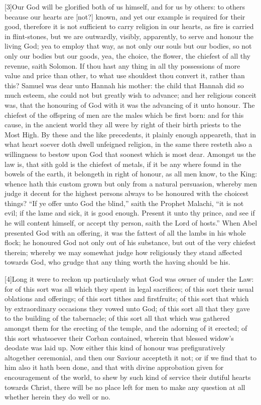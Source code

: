 [3]Our God will be glorified both of us himself, and for us by others: to others because our hearts are [not?] known, and yet our example is required for their good, therefore it is not sufficient to carry religion in our hearts, as fire is carried in flint-stones, but we are outwardly, visibly, apparently, to serve and honour the living God; yea to employ that way, as not only our souls but our bodies, so not only our bodies but our goods, yea, the choice, the flower, the chiefest of all thy revenue, saith Solomon. If thou hast any thing in all thy possessions of more value and price than other, to what use shouldest thou convert it, rather than this? Samuel was dear unto Hannah his mother: the child that  Hannah did so much esteem, she could not but greatly wish to advance; and her religious conceit was, that the honouring of God with it was the advancing of it unto honour. The chiefest of the offspring of men are the males which be first born: and for this cause, in the ancient world they all were by right of their birth priests to the Most High. By these and the like precedents, it plainly enough appeareth, that in what heart soever doth dwell unfeigned religion, in the same there resteth also a willingness to bestow upon God that soonest which is most dear. Amongst us the law is, that sith gold is the chiefest of metals, if it be any where found in the bowels of the earth, it belongeth in right of honour, as all men know, to the King: whence hath this custom grown but only from a natural persuasion, whereby men judge it decent for the highest persons always to be honoured with the choicest things? “If ye offer unto God the blind,” saith the Prophet Malachi, “it is not evil; if the lame and sick, it is good enough. Present it unto thy prince, and see if he will content himself, or accept thy person, saith the Lord of hosts.” When Abel presented God with an offering, it was the fattest of all the lambs in his whole flock; he honoured God not only out of his substance, but out of the very chiefest therein; whereby we may somewhat judge how religiously they stand affected towards God, who grudge that any thing worth the having should be his.

[4]Long it were to reckon up particularly what God was owner of under the Law: for of this sort was all which they spent in legal sacrifices; of this sort their usual oblations and offerings; of this sort tithes and firstfruits; of this sort that which by extraordinary occasions they vowed unto God; of this sort all that they gave to the building of the tabernacle; of this sort all that which was gathered amongst them for the erecting of the temple, and the adorning of it erected; of this sort whatsoever their Corban contained, wherein that blessed widow’s deodate was laid up. Now either this kind of honour was prefiguratively altogether ceremonial, and then  our Saviour accepteth it not; or if we find that to him also it hath been done, and that with divine approbation given for encouragement of the world, to shew by such kind of service their dutiful hearts towards Christ, there will be no place left for men to make any question at all whether herein they do well or no.

